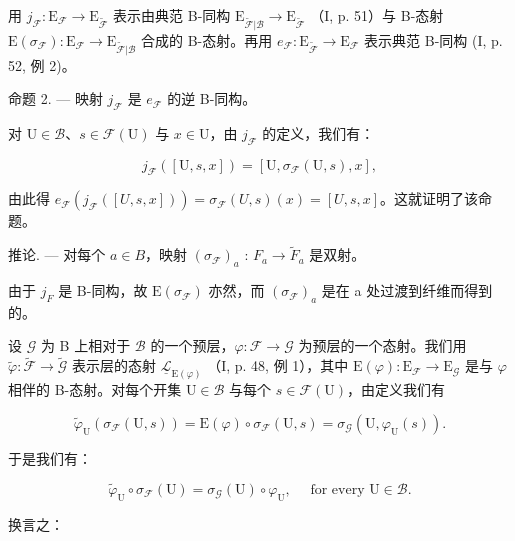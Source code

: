 用 \(j_{\mathcal{F}} \colon \mathrm{E}_{\mathcal{F}} \to \mathrm{E}_{\widetilde{\mathcal{F}}}\) 表示由典范 B-同构 \(\mathrm{E}_{\widetilde{\mathcal{F}}|\mathcal{B}} \to \mathrm{E}_{\widetilde{\mathcal{F}}}\) （I, p. 51）与 B-态射 \(\mathrm{E}(\sigma_{\mathcal{F}}) \colon \mathrm{E}_{\mathcal{F}} \to \mathrm{E}_{\widetilde{\mathcal{F}}|\mathcal{B}}\) 合成的 B-态射。再用 \(e_{\mathcal{F}} \colon \mathrm{E}_{\widetilde{\mathcal{F}}} \to \mathrm{E}_{\mathcal{F}}\) 表示典范 B-同构 (I, p. 52, 例 2)。

命题 2. --- 映射 \(j_{\mathcal{F}}\) 是 \(e_{\mathcal{F}}\) 的逆 B-同构。

对 \(\mathrm{U}\in \mathcal{B}\)、\(s\in \mathcal{F}(\mathrm{U})\) 与 \(x\in \mathrm{U}\)，由 \(j_{\mathcal{F}}\) 的定义，我们有：

\[
j _ {\mathcal {F}} ([ \mathrm{U}, s, x ]) = [ \mathrm{U}, \sigma_ {\mathcal {F}} (\mathrm{U}, s), x ],
\]

由此得 \(e_{\mathcal{F}}(j_{\mathcal{F}}([U,s,x])) = \sigma_{\mathcal{F}}(U,s)(x) = [U,s,x]\)。这就证明了该命题。

推论. --- 对每个 \(a \in B\)，映射 \((\sigma_{\mathcal{F}})_{a}\) : \(F_{a} \to \widetilde{F}_{a}\) 是双射。

由于 \(j_{F}\) 是 B-同构，故 \(\mathrm{E}(\sigma_{\mathcal{F}})\) 亦然，而 \((\sigma_{\mathcal{F}})_{a}\) 是在 a 处过渡到纤维而得到的。

设 \(\mathcal{G}\) 为 B 上相对于 \(\mathcal{B}\) 的一个预层，\(\varphi\colon\mathcal{F}\to\mathcal{G}\) 为预层的一个态射。我们用 \(\widetilde{\varphi}\colon\widetilde{\mathcal{F}}\to\widetilde{\mathcal{G}}\) 表示层的态射 \(\underline{\mathcal{L}}_{\mathrm{E}(\varphi)}\) （I, p. 48, 例 1），其中 \(\mathrm{E}(\varphi)\colon\mathrm{E}_{\mathcal{F}}\to\mathrm{E}_{\mathcal{G}}\) 是与 \(\varphi\) 相伴的 B-态射。对每个开集 \(\mathrm{U}\in\mathcal{B}\) 与每个 \(s\in\mathcal{F}(\mathrm{U})\)，由定义我们有

\[
\widetilde {\varphi} _ {\mathrm{U}} (\sigma_ {\mathcal {F}} (\mathrm{U}, s)) = \mathrm{E} (\varphi) \circ \sigma_ {\mathcal {F}} (\mathrm{U}, s) = \sigma_ {\mathcal {G}} (\mathrm{U}, \varphi_ {\mathrm{U}} (s)).
\]

于是我们有：

\[
\widetilde {\varphi} _ {\mathrm{U}} \circ \sigma_ {\mathcal {F}} (\mathrm{U}) = \sigma_ {\mathcal {G}} (\mathrm{U}) \circ \varphi_ {\mathrm{U}}, \quad \text {   for   every   } \mathrm{U} \in \mathcal {B}.\tag{1}
\]

换言之：

